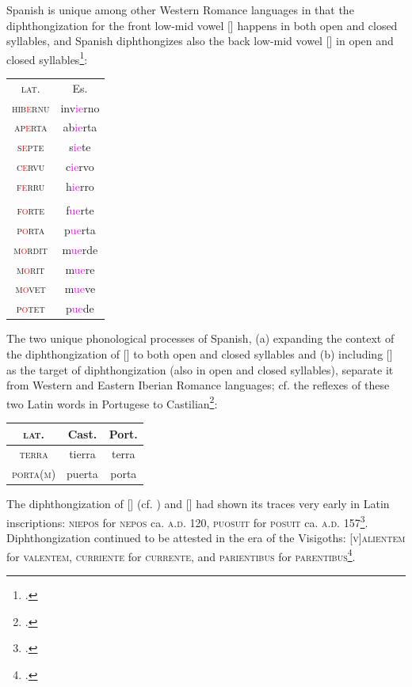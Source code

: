 \documentclass{report}[12pt]
\begin{document}
Spanish is unique among other Western Romance languages in that the diphthongization for the front low-mid vowel [] happens in both open and closed syllables, and Spanish diphthongizes also the back low-mid vowel [] in open and closed syllables\footcites[p.~122]{lloyd_spanish}[p.~15-16]{romance_his}:
\begin{center}
  \begin{tabular}{c c}
    \textsc{lat.} & Es. \\
    \textsc{hib\textcolor{red}{e}rnu} & inv\textcolor{magenta}{ie}rno \\
    \textsc{ap\textcolor{red}{e}rta} & ab\textcolor{magenta}{ie}rta \\
    \textsc{s\textcolor{red}{e}pte} & s\textcolor{magenta}{ie}te \\
    \textsc{c\textcolor{red}{e}rvu} & c\textcolor{magenta}{ie}rvo \\
    \textsc{f\textcolor{red}{e}rru} & h\textcolor{magenta}{ie}rro \\
                  & \\
    \textsc{f\textcolor{red}{o}rte} & f\textcolor{magenta}{ue}rte \\
    \textsc{p\textcolor{red}{o}rta} & p\textcolor{magenta}{ue}rta \\
    \textsc{m\textcolor{red}{o}rdit} & m\textcolor{magenta}{ue}rde \\
    \textsc{m\textcolor{red}{o}rit} & m\textcolor{magenta}{ue}re \\
    \textsc{m\textcolor{red}{o}vet} & m\textcolor{magenta}{ue}ve \\
    \textsc{p\textcolor{red}{o}tet} & p\textcolor{magenta}{ue}de \\
  \end{tabular}
\end{center}
The two unique phonological processes of Spanish, (a) expanding the context of the diphthongization of [] to both open and closed syllables and (b) including [] as the target of diphthongization (also in open and closed syllables), separate it from Western and Eastern Iberian Romance languages; cf. the reflexes of these two Latin words in Portugese to Castilian\footcite[p.~3]{hualde_iberian}:
\begin{center}
  \begin{tabular}{c c c}    
    \textsc{lat.} & Cast. & Port. \\
    \hline
    \textsc{terra} & tierra & terra \\
    \textsc{porta(m)} & puerta & porta \\
  \end{tabular}
\end{center}
The diphthongization of [] (cf. ) and [] had shown its traces very early in Latin inscriptions: \textsc{niepos} for \textsc{nepos} ca. \textsc{a.d.} 120, \textsc{puosuit} for \textsc{posuit} ca. \textsc{a.d.} 157\footcite[p.~129-130]{lloyd_spanish}. Diphthongization continued to be attested in the era of the Visigoths: \textsc{[v]alientem} for \textsc{valentem}, \textsc{curriente} for \textsc{currente}, and \textsc{parientibus} for \textsc{parentibus}\footcite[p.~130]{lloyd_spanish}.
\end{document}

